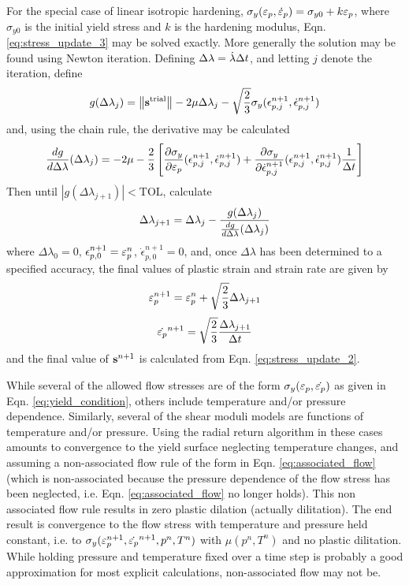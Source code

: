 For the special case of linear isotropic hardening,
$\sigma_y(\varepsilon_p,\dot{\varepsilon}_{p})=\sigma_{y0}+k\varepsilon_p$, where $\sigma_{y0}$ is the
initial yield stress and $k$ is the hardening modulus,
Eqn. \ref{eq:stress_update_3} may be solved exactly.  More generally
the solution may be found using Newton iteration.  Defining
$\Delta\lambda = \dot{\lambda}\Delta t$, and letting $j$ denote the
iteration, define
  \begin{equation}
     g(\Delta\lambda_j) = \left\lVert\mathbf{s}^{\text{trial}}\right\rVert - 2\mu\Delta\lambda_j - \sqrt{2\over3}\sigma_y(\epsilon_{p,j}^{n+1},\dot{\epsilon}_{p,j}^{n+1})
  \end{equation}
and, using the chain rule, the derivative may be calculated
  \begin{equation}
     {dg\over d\Delta\lambda}(\Delta\lambda_j) = - 2\mu - {2\over3}\left[{\partial\sigma_y\over \partial\varepsilon_p}(\epsilon_{p,j}^{n+1},\dot{\epsilon}_{p,j}^{n+1}) + {\partial\sigma_y\over \partial{\dot{\epsilon}_{p,j}^{n+1}}}(\epsilon_{p,j}^{n+1},\dot{\epsilon}_{p,j}^{n+1}){1\over\Delta t} \right]
  \end{equation}
Then until $|g(\Delta\lambda_{j+1})| < \text{TOL}$, calculate
  \begin{equation}
     \Delta\lambda_{j+1}=\Delta\lambda_j-{g(\Delta\lambda_j)\over{dg\over d\Delta\lambda}(\Delta\lambda_j)}
  \end{equation}
where $\Delta\lambda_0=0$, $\epsilon_{p,0}^{n+1}=\varepsilon_p^n$,
$\dot{\epsilon}_{p,0}^{n+1}=0$, and, once $\Delta\lambda$ has been
determined to a specified accuracy, the final values of plastic strain
and strain rate are given by
  \begin{equation}
    \varepsilon_p^{n+1}=\varepsilon_p^n+\sqrt{2\over3}\Delta\lambda_{j+1}
  \end{equation}
  \begin{equation}
    \dot{\varepsilon_p}^{n+1}=\sqrt{2\over3}{\Delta\lambda_{j+1}\over\Delta t}
  \end{equation}
and the final value of $\mathbf{s}^{n+1}$ is calculated from Eqn. \ref{eq:stress_update_2}.

While several of the allowed flow stresses are of the form
$\sigma_y(\varepsilon_p,\dot{\varepsilon_p})$ as given in Eqn. \ref{eq:yield_condition},
others include temperature and/or pressure dependence.  Similarly,
several of the shear moduli models are functions of temperature and/or
pressure.  Using the radial return algorithm in these cases amounts to
convergence to the yield surface neglecting temperature changes, and
assuming a non-associated flow rule of the form in
Eqn. \ref{eq:associated_flow} (which is non-associated because the
pressure dependence of the flow stress has been neglected,
i.e. Eqn. \ref{eq:associated_flow} no longer holds).  This non
associated flow rule results in zero plastic dilation (actually
dilitation).  The end result is convergence to the flow stress with
temperature and pressure held constant, i.e. to
$\sigma_y(\varepsilon_p^{n+1},\dot{\varepsilon_p}^{n+1},p^n,T^n)$ with $\mu(p^n,T^n)$ and
no plastic dilitation.  While holding pressure and temperature fixed
over a time step is probably a good approximation for most explicit
calculations, non-associated flow may not be.

